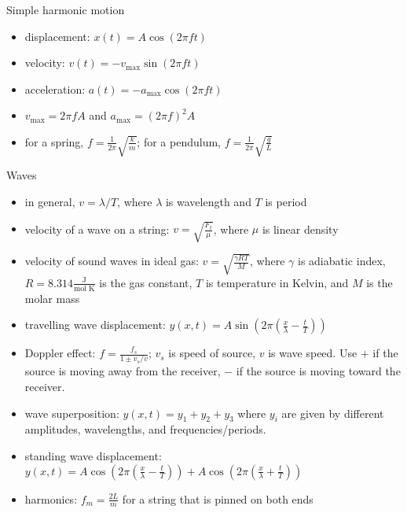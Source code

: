 \documentclass[11pt,letterpaper]{article}
\begin{document}
Simple harmonic motion
\begin{itemize}
\item displacement: $x(t)=A\cos(2\pi{f}t)$
\item velocity: $v(t)=-v_{\mathrm{max}}\sin(2\pi{f}t)$
\item acceleration: $a(t)=-a_{\mathrm{max}}\cos(2\pi{f}t)$
\item $v_{\mathrm{max}}=2\pi{f}A$ and $a_{\mathrm{max}}=(2\pi{f})^2A$
\item for a spring, $f=\frac{1}{2\pi}\sqrt{\frac{k}{m}}$; for a pendulum, $f=\frac{1}{2\pi}\sqrt{\frac{g}{L}}$
\end{itemize}

Waves
\begin{itemize}
\item in general, $v=\lambda/T$, where $\lambda$ is wavelength and $T$ is period
\item velocity of a wave on a string: $v=\sqrt{\frac{F_t}{\mu}}$, where $\mu$ is linear density
\item velocity of sound waves in ideal gas: $v=\sqrt{\frac{\gamma{RT}}{M}}$, where $\gamma$ is adiabatic index, $R=8.314\frac{\mbox{J}}{\mbox{mol K}}$ is the gas constant, $T$ is temperature in Kelvin, and $M$ is the molar mass
\item travelling wave displacement: $y(x,t)=A\sin\left(2\pi\left(\frac{x}{\lambda}-\frac{t}{T}\right)\right)$
\item Doppler effect: $f=\frac{f_s}{1\pm{v_s}/v}$; $v_s$ is speed of source, $v$ is wave speed. Use $+$ if the source is moving away from the receiver, $-$ if the source is moving toward the receiver.
\item wave superposition: $y(x,t)=y_1+y_2+y_3$ where $y_i$ are given by different amplitudes, wavelengths, and frequencies/periods.
\item standing wave displacement: $y(x,t)=A\cos\left(2\pi\left(\frac{x}{\lambda}-\frac{t}{T}\right)\right)+A\cos\left(2\pi\left(\frac{x}{\lambda}+\frac{t}{T}\right)\right)$
\item harmonics: $f_m=\frac{2L}{m}$ for a string that is pinned on both ends
\end{itemize}
\end{document}
